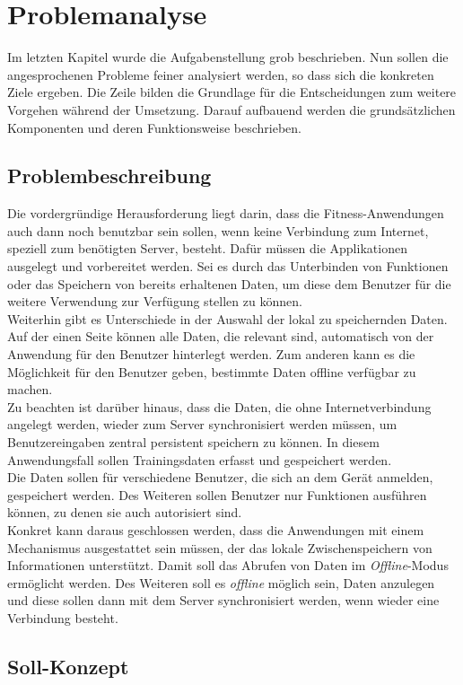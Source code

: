 \chapter{Problemanalyse}
\label{cha:problemanalyse}
Im letzten Kapitel wurde die Aufgabenstellung grob beschrieben. Nun sollen die angesprochenen Probleme feiner analysiert werden, so dass sich die konkreten Ziele ergeben. Die Zeile bilden die Grundlage für die Entscheidungen zum weitere Vorgehen während der Umsetzung. Darauf aufbauend werden die grundsätzlichen Komponenten und deren Funktionsweise beschrieben.
\section{Problembeschreibung}
\label{sec:problembeschreibung}
Die vordergründige Herausforderung liegt darin, dass die Fitness-Anwendungen auch dann noch benutzbar sein sollen, wenn keine Verbindung zum Internet, speziell zum benötigten Server, besteht. Dafür müssen die Applikationen ausgelegt und vorbereitet werden. Sei es durch das Unterbinden von Funktionen oder das Speichern von bereits erhaltenen Daten, um diese dem Benutzer für die weitere Verwendung zur Verfügung stellen zu können. \\
Weiterhin gibt es Unterschiede in der Auswahl der lokal zu speichernden Daten. Auf der einen Seite können alle Daten, die relevant sind, automatisch von der Anwendung für den Benutzer hinterlegt werden. Zum anderen kann es die Möglichkeit für den Benutzer geben, bestimmte Daten offline verfügbar zu machen.\\
Zu beachten ist darüber hinaus, dass die Daten, die ohne Internetverbindung angelegt werden, wieder zum Server synchronisiert werden müssen, um Benutzereingaben zentral persistent speichern zu können. In diesem Anwendungsfall sollen Trainingsdaten erfasst und gespeichert werden.\\
Die Daten sollen für verschiedene Benutzer, die sich an dem Gerät anmelden, gespeichert werden. Des Weiteren sollen Benutzer nur Funktionen ausführen können, zu denen sie auch autorisiert sind.\\
Konkret kann daraus geschlossen werden, dass die Anwendungen mit einem Mechanismus ausgestattet sein müssen, der das lokale Zwischenspeichern von Informationen unterstützt. Damit soll das Abrufen von Daten im \textit{Offline}-Modus ermöglicht werden. Des Weiteren soll es \textit{offline} möglich sein, Daten anzulegen und diese sollen dann mit dem Server synchronisiert werden, wenn wieder eine Verbindung besteht.\section{Soll-Konzept}
\label{sec:soll-konzept}

